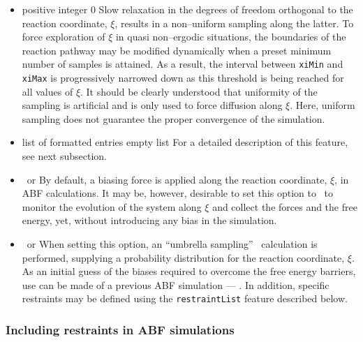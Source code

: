 \begin{itemize}
\item
{}
{positive integer}
{0}
{Slow relaxation in the degrees of freedom orthogonal to the reaction
 coordinate, $\xi$, results in a non--uniform sampling along the latter.
 To force exploration of $\xi$ in quasi non--ergodic situations, the
 boundaries of the reaction pathway may be modified dynamically when a
 preset minimum number of samples is attained. As a result, the
 interval between {\tt xiMin} and {\tt xiMax} is progressively narrowed
 down as this threshold is being reached for all values of $\xi$.
 It should be clearly understood that uniformity of the sampling
 is artificial and is only used to force diffusion along $\xi$. Here,
 uniform sampling does not guarantee the proper convergence of the
 simulation. }


\item
{}
{list of formatted entries}
{empty list}
{For a detailed description of
 this feature, see next subsection.}


\item
{}
{\yes \ or \no}
{\yes}
{By default, a biasing force is applied along the reaction coordinate,
 $\xi$, in ABF calculations. It may be, however, desirable to set
 this option to \no \ to monitor the evolution of the system along
 $\xi$ and collect the forces and the free energy, yet,
 without introducing any bias in the simulation.}


\item
{}
{\yes \ or \no}
{\no}
{When setting this option, an ``umbrella sampling''~\cite{torr_77_2}
 calculation
 is performed, supplying a probability distribution
 for the reaction coordinate, $\xi$. As an initial
 guess of the biases required to overcome the free energy
 barriers, use can be made of a previous ABF simulation ---
 . In addition, specific restraints may
 be defined using the {\tt restraintList} feature described below.}

\end{itemize}



\subsubsection{Including restraints in ABF simulations}


